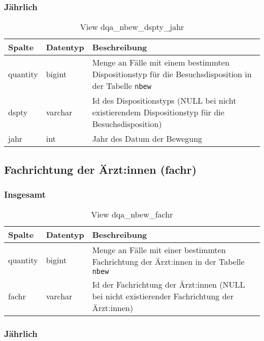 \subsubsection{Jährlich} \label{subsubsec:bewDsptyJ}

\begin{table}[ht]
	\centering   
	\caption{View dqa\_nbew\_dspty\_jahr}
	\label{tab:bewDsptyJ}
	\begin{tabular}{||l|l|p{10cm}||}   		
		\hline
		Spalte & Datentyp & Beschreibung \\ [0.5ex]
		\hline\hline
		quantity & bigint & Menge an Fälle mit einem bestimmten Dispositionstyp für die Besuchsdisposition in der Tabelle \texttt{nbew}\\
		\hline
		dspty & varchar & Id des Dispositionstyps (NULL bei nicht existierendem Dispositionstyp für die Besuchsdisposition)\\
		\hline
		jahr & int &  Jahr des Datum der Bewegung \\
		\hline		
	\end{tabular}
\end{table}
\newpage
\subsection{Fachrichtung der Ärzt:innen (fachr)} \label{subsec:bewFachr}

\subsubsection{Insgesamt} \label{subsubsec:bewFachrI}

\begin{table}[ht]
	\centering   
	\caption{View dqa\_nbew\_fachr}
	\label{tab:bewFachrI}
	\begin{tabular}{||l|l|p{10cm}||}   		
		\hline
		Spalte & Datentyp & Beschreibung \\ [0.5ex]
		\hline\hline
		quantity & bigint & Menge an Fälle mit einer bestimmten Fachrichtung der Ärzt:innen in der Tabelle \texttt{nbew} \\
		\hline
		fachr & varchar & Id der Fachrichtung der Ärzt:innen (NULL bei nicht existierender Fachrichtung der Ärzt:innen)\\
		\hline
		
	\end{tabular}
\end{table}

\subsubsection{Jährlich} \label{subsubsec:bewFachrJ}

